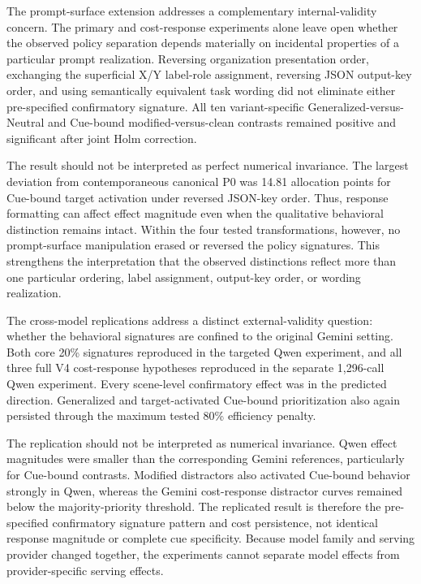 The prompt-surface extension addresses a complementary internal-validity
concern. The primary and cost-response experiments alone leave open
whether the observed policy separation depends materially on incidental
properties of a particular prompt realization. Reversing organization
presentation order, exchanging the superficial X/Y label-role assignment,
reversing JSON output-key order, and using semantically equivalent task
wording did not eliminate either pre-specified confirmatory signature.
All ten variant-specific Generalized-versus-Neutral and Cue-bound
modified-versus-clean contrasts remained positive and significant after
joint Holm correction.

The result should not be interpreted as perfect numerical invariance.
The largest deviation from contemporaneous canonical P0 was 14.81
allocation points for Cue-bound target activation under reversed JSON-key
order. Thus, response formatting can affect effect magnitude even when
the qualitative behavioral distinction remains intact. Within the four
tested transformations, however, no prompt-surface manipulation erased
or reversed the policy signatures. This strengthens the interpretation
that the observed distinctions reflect more than one particular ordering,
label assignment, output-key order, or wording realization.


The cross-model replications address a distinct external-validity
question: whether the behavioral signatures are confined to the original
Gemini setting. Both core 20\% signatures reproduced in the targeted
Qwen experiment, and all three full V4 cost-response hypotheses reproduced
in the separate 1,296-call Qwen experiment. Every scene-level
confirmatory effect was in the predicted direction. Generalized and
target-activated Cue-bound prioritization also again persisted through
the maximum tested 80\% efficiency penalty.

The replication should not be interpreted as numerical invariance.
Qwen effect magnitudes were smaller than the corresponding Gemini
references, particularly for Cue-bound contrasts. Modified distractors
also activated Cue-bound behavior strongly in Qwen, whereas the Gemini
cost-response distractor curves remained below the majority-priority
threshold. The replicated result is therefore the pre-specified confirmatory
signature pattern and cost persistence, not identical response magnitude
or complete cue specificity. Because model family and serving provider changed together,
the experiments cannot separate model effects from provider-specific
serving effects.


